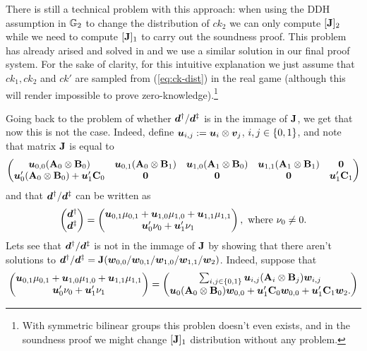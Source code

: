 There is still a technical problem with this approach: when using the DDH assumption in $\mathbb{G}_2$ to change the distribution of $ck_2$ we can only compute $[\mathbf{{J}}]_2$ while we need to compute $[\mathbf{{J}}]_1$ to carry out the soundness proof. This problem has already arised and solved in \cite{AC:GonHevRaf15} and we use a similar solution in our final proof system. For the sake of clarity, for this intuitive explanation we just assume that $ck_1,ck_2$ and $ck'$ are sampled from (\ref{eq:ck-dist}) in the real game (although this will render impossible to prove zero-knowledge).\footnote{With symmetric bilinear groups this problen doesn't even exists, and in the soundness proof we might change $[\mathbf{{J}}]_1$ distribution without any problem.}

Going back to the problem of whether ${\boldsymbol{d}}^\dag/ {\boldsymbol{d}}^\ddag$ is in the immage of $\mathbf{{J}}$, we get that now this is not the case. Indeed, define ${\boldsymbol{u}}_{i,j}:={\boldsymbol{u}}_i\otimes{\boldsymbol{v}}_j$, $i,j\in\{0,1\}$, and note that matrix $\mathbf{{J}}$ is equal to
$$
\begin{pmatrix}
{\boldsymbol{u}}_{0,0}(\mathbf{{A}}_0\otimes\mathbf{{B}}_0) & {\boldsymbol{u}}_{0,1}(\mathbf{{A}}_0\otimes\mathbf{{B}}_1) & {\boldsymbol{u}}_{1,0}(\mathbf{{A}}_1\otimes\mathbf{{B}}_0) & {\boldsymbol{u}}_{1,1}(\mathbf{{A}}_1\otimes\mathbf{{B}}_1) & {\boldsymbol{0}}\\
{\boldsymbol{u}}'_0(\mathbf{{A}}_0\otimes\mathbf{{B}}_0) +{\boldsymbol{u}}'_1\mathbf{{C}}_0 & {\boldsymbol{0}} & {\boldsymbol{0}} & {\boldsymbol{0}} & {\boldsymbol{u}}'_1\mathbf{{C}}_1
\end{pmatrix}
$$
and that ${\boldsymbol{d}}^\dag/{\boldsymbol{d}}^\ddag$ can be written as
$$
\begin{pmatrix} {\boldsymbol{d}}^\dag\\ {\boldsymbol{d}}^\ddag \end{pmatrix}
=
\begin{pmatrix}
{\boldsymbol{u}}_{0,1}\mu_{0,1} + {\boldsymbol{u}}_{1,0}\mu_{1,0} + {\boldsymbol{u}}_{1,1}\mu_{1,1}\\
{\boldsymbol{u}}'_{0}\nu_{0} + {\boldsymbol{u}}'_1\nu_1
\end{pmatrix},
\text{ where } \nu_0 \neq 0.
$$
Lets see that ${\boldsymbol{d}}^\dag/{\boldsymbol{d}}^\ddag$ is not in the immage of $\mathbf{{J}}$ by showing that there aren't solutions to ${\boldsymbol{d}}^\dag/{\boldsymbol{d}}^\ddag=\mathbf{{J}}({\boldsymbol{w}}_{0,0}/{\boldsymbol{w}}_{0,1}/{\boldsymbol{w}}_{1,0}/{\boldsymbol{w}}_{1,1}/{\boldsymbol{w}}_2)$. Indeed, suppose that
\begin{align}
\begin{pmatrix}
{\boldsymbol{u}}_{0,1}\mu_{0,1} + {\boldsymbol{u}}_{1,0}\mu_{1,0} + {\boldsymbol{u}}_{1,1}\mu_{1,1}\\
{\boldsymbol{u}}'_{0}\nu_{0} + {\boldsymbol{u}}'_1\nu_1
\end{pmatrix}
=
\begin{pmatrix}
\sum_{i,j\in\{0,1\}}{\boldsymbol{u}}_{i,j}(\mathbf{{A}}_i\otimes\mathbf{{B}}_j){\boldsymbol{w}}_{i,j}\\
{\boldsymbol{u}}_0(\mathbf{{A}}_0\otimes\mathbf{{B}}_0){\boldsymbol{w}}_{0,0} + {\boldsymbol{u}}'_1\mathbf{{C}}_0{\boldsymbol{w}}_{0,0}+{\boldsymbol{u}}'_1\mathbf{{C}}_1{\boldsymbol{w}}_2.
\end{pmatrix}
\label{eq:d-li}
\end{align}
